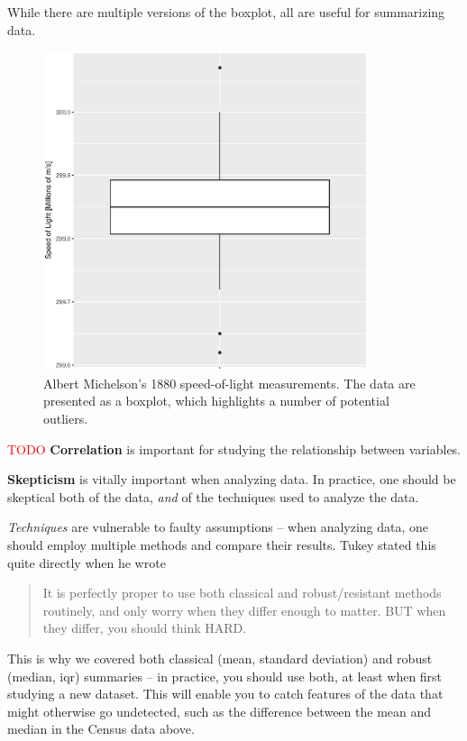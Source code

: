 \documentclass[../primer.tex]{subfiles}
\begin{document}
While there are multiple versions of the boxplot,\cite{frigge1989some} all are
useful for summarizing data.

\begin{figure}[!ht]
  \centering
  \includegraphics[width=0.85\textwidth]{./images/michelson_boxplot}

  \caption{Albert Michelson's 1880 speed-of-light measurements. The data are
    presented as a boxplot, which highlights a number of potential outliers.}
\end{figure}

\textcolor{red}{TODO} \textbf{Correlation} is important for studying the
relationship between variables.

\textbf{Skepticism} is vitally important when analyzing data. In practice, one
should be skeptical both of the data, \emph{and} of the techniques used to
analyze the data.

\emph{Techniques} are vulnerable to faulty assumptions -- when analyzing data,
one should employ multiple methods and compare their results.
Tukey\cite{tukey1979robust} stated this quite directly when he wrote

\begin{quote}
It is perfectly proper to use both classical and robust/resistant methods
routinely, and only worry when they differ enough to matter. BUT when they
differ, you should think HARD.
\end{quote}

This is why we covered both classical (mean, standard deviation) and robust
(median, iqr) summaries -- in practice, you should use both, at least when first
studying a new dataset. This will enable you to catch features of the data that
might otherwise go undetected, such as the difference between the mean and
median in the Census data above.
\end{document}

